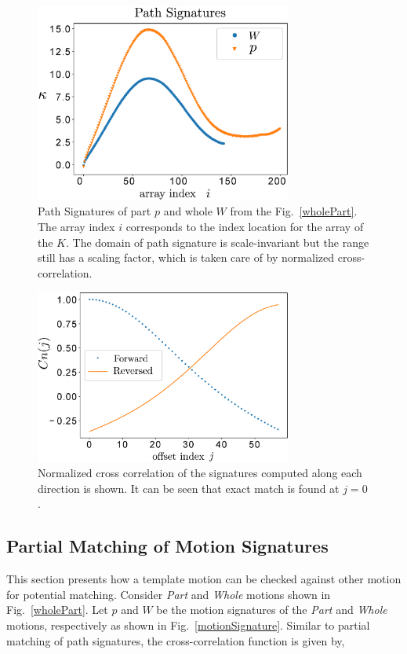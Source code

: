 \begin{figure}
\centering
\includegraphics[width=240pt]{jcise-18/figure/fig_path_signatures.eps}
  \caption{Path Signatures of part $p$ and whole $W$ from the Fig.~\ref{wholePart}. The array index $i$ corresponds to the index location for the array of the $K$. The domain of path signature is scale-invariant but the range still has a scaling factor, which is taken care of by normalized cross-correlation.}
\label{pathSignature}
\end{figure}

\begin{figure}
\centering
\includegraphics[width=240pt]{jcise-18/figure/fig_ncc.eps}
  \caption{Normalized cross correlation of the signatures computed along each direction is shown. It can be seen that exact match is found at $j=0$.}
\label{ncc}
\end{figure}

\subsection{Partial Matching of Motion Signatures}\label{sec_mcc}
This section presents how a template motion can be checked against other motion for potential matching.
Consider \emph{Part} and \emph{Whole} motions shown in Fig.~\ref{wholePart}.
Let $p$ and $W$ be the motion signatures of the \emph{Part} and \emph{Whole} motions, respectively as shown in Fig.~\ref{motionSignature}.
Similar to partial matching of path signatures, the cross-correlation function is given by,

